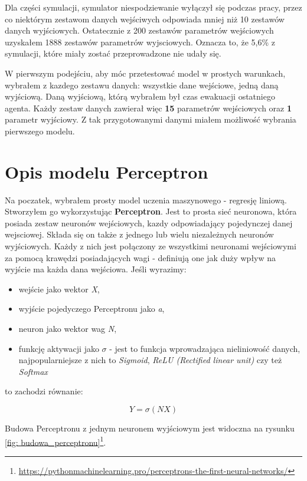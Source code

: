 \documentclass[12pt]{aghdpl}
\begin{document}
		Dla części symulacji, symulator niespodziewanie wyłączył się podczas pracy, przez co niektórym zestawom danych wejściwych odpowiada mniej niż 10 zestawów danych wyjściowych. Ostatecznie z 200 zestawów parametrów wejściowych uzyskałem 1888 zestawów parametrów wyjsciowych. Oznacza to, że 5,6\% z symulacji, które miały zostać przeprowadzone nie udały się.	
		
		W pierwszym podejściu, aby móc przetestować model w prostych warunkach, wybrałem z kazdego zestawu danych: wszystkie dane wejściowe, jedną daną wyjściową. Daną wyjściową, którą wybrałem był czas ewakuacji ostatniego agenta. Każdy zestaw danych zawierał więc \textbf{15} parametrów wejściowych oraz \textbf{1} parametr wyjściowy. Z tak przygotowanymi danymi miałem możliwość wybrania pierwszego modelu.
		
		\section{Opis modelu Perceptron}		
		Na poczatek, wybrałem prosty model uczenia maszynowego - regresję liniową. Stworzyłem go wykorzystując \textbf{Perceptron}. Jest to prosta sieć neuronowa, która posiada zestaw neuronów wejściowych, kazdy odpowiadający pojedynczej danej wejsciowej. Składa się on także z jednego lub wielu niezależnych neuronów wyjściowych. Każdy z nich jest połączony ze wszystkimi neuronami wejściowymi za pomocą krawędzi posiadających wagi - definiują one jak duży wpływ na wyjście ma każda dana wejściowa. Jeśli wyrazimy:
		\begin{itemize}
		\item wejście jako wektor \textit{X},
		\item wyjście pojedyczego Perceptronu jako \textit{a},
		\item neuron jako wektor wag \textit{N},
		\item funkcję aktywacji jako $\sigma$ - jest to funkcja wprowadzająca nieliniowość danych, najpopularniejsze z nich to \textit{Sigmoid}, \textit{ReLU (Rectified linear unit)} czy też \textit{Softmax}
		\end{itemize}
		to zachodzi równanie:
		
		\begin{equation}
		Y=\sigma(NX)
		\end{equation}
	
		Budowa Perceptronu z jednym neuronem wyjściowym jest widoczna na rysunku \ref{fig: budowa_perceptronu}\footnote{\url{https://pythonmachinelearning.pro/perceptrons-the-first-neural-networks/}}.
\end{document}
